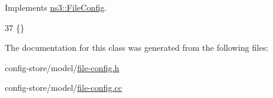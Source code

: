 Implements \hyperlink{classns3_1_1FileConfig_a427396d92d297ec87fb94ba4b8d96b0b}{ns3\+::\+File\+Config}.


\begin{DoxyCode}
37 \{\}
\end{DoxyCode}


The documentation for this class was generated from the following files\+:\begin{DoxyCompactItemize}
\item 
config-\/store/model/\hyperlink{file-config_8h}{file-\/config.\+h}\item 
config-\/store/model/\hyperlink{file-config_8cc}{file-\/config.\+cc}\end{DoxyCompactItemize}

